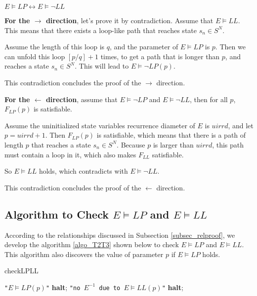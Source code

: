 \documentclass[journal]{IEEEtran}
\begin{document}
\begin{theorem}\label{T2toT3}
$E\vDash LP\leftrightarrow E\vDash\neg LL$
\end{theorem}
\begin{IEEEproof}
\textbf{For the $\to$ direction},
let's prove it by contradiction.
Assume that $E\vDash LL$.
This means that there exists a loop-like path that reaches state $s_n\in S^{N}$.

Assume the length of this loop is $q$,
and the parameter of $E\vDash LP$ is $p$.
Then we can unfold this loop $[p/q]+1$ times,
to get a path that is longer than $p$,
and reaches a state $s_n\in S^{N}$.
This will lead to $E\vDash\neg LP(p)$.

This contradiction concludes the proof of the $\to$ direction.

\textbf{For the $\gets$ direction},
assume that $E\vDash\neg LP$ and $E\vDash\neg LL$,
then for all $p$,
$F_{LP}(p)$ is satisfiable.

Assume the uninitialized state variables recurrence diameter of $E$ is $uirrd$,
and let $p=uirrd+1$.
Then $F_{LP}(p)$ is satisfiable,
which means that there is a path of length $p$ that reaches a state $s_n\in S^{N}$.
Because $p$ is larger than $uirrd$,
this path must contain a loop in it,
which also makes $F_{LL}$ satisfiable.

So $E\vDash LL$ holds,
which contradicts with $E\vDash\neg LL$.

This contradiction concludes the proof of the $\gets$ direction.
\end{IEEEproof}

\subsection{Algorithm to Check $E\vDash LP$ and $E\vDash LL$}\label{subsec_t1t2}
According to the relationships discussed in Subsection \ref{subsec_relproof},
we develop the algorithm \ref{algo_T2T3} shown below to check $E\vDash LP$ and $E\vDash LL$.
This algorithm also discovers the value of parameter $p$ if $E\vDash LP$ holds.

\begin{algorithm}
\caption{checkLPLL}
\label{algo_T2T3}
\begin{algorithmic}[1]
\PRINT \texttt{"$E\vDash LP(p)$"}\label{lab_t2}
\STATE \textbf{halt};
\PRINT \texttt{"no $E^{-1}$ due to $E\vDash LL(p)$"}\label{lab_t3}
\STATE \textbf{halt};
\ENDIF
\ENDFOR
\end{algorithmic}
\end{algorithm}
\end{document}
